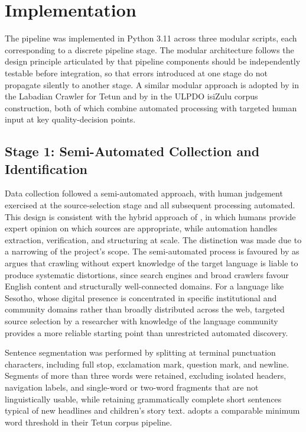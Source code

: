 \documentclass[12pt]{ThesisRU}
\begin{document}
\section{Implementation}
The pipeline was implemented in Python 3.11 across three modular scripts, each corresponding to a discrete pipeline stage. The modular architecture follows the design principle articulated by \citet{suchomel2020better} that pipeline components should be independently testable before integration, so that errors introduced at one stage do not propagate silently to another stage. A similar modular approach is adopted by \citet{de2024data} in the Labadian Crawler for Tetun and by \citet{gumede2025creating} in the ULPDO isiZulu corpus construction, both of which combine automated processing with targeted human input at key quality-decision points.

\subsection{Stage 1: Semi-Automated Collection and Identification}
\label{sec:semi-automated}
Data collection followed a semi-automated approach, with human judgement exercised at the source-selection stage and all subsequent processing automated. This design is consistent with the hybrid approach of \citet{gumede2025creating}, in which humans provide expert opinion on which sources are appropriate, while automation handles extraction, verification, and structuring at scale. The distinction was made due to a narrowing of the project's scope. The semi-automated process is favoured by \citet{barbaresi2013challenges} as \citet{barbaresi2013challenges} argues that crawling without expert knowledge of the target language is liable to produce systematic distortions, since search engines and broad crawlers favour English content and structurally well-connected domains. For a language like Sesotho, whose digital presence is concentrated in specific institutional and community domains rather than broadly distributed across the web, targeted source selection by a researcher with knowledge of the language community provides a more reliable starting point than unrestricted automated discovery.

Sentence segmentation was performed by splitting at terminal punctuation characters, including full stop, exclamation mark, question mark, and newline. Segments of more than three words were retained, excluding isolated headers, navigation labels, and single-word or two-word fragments that are not linguistically usable, while retaining grammatically complete short sentences typical of new headlines and children's story text. \citep{de2024data} adopts a comparable minimum word threshold in their Tetun corpus pipeline.
\end{document}
